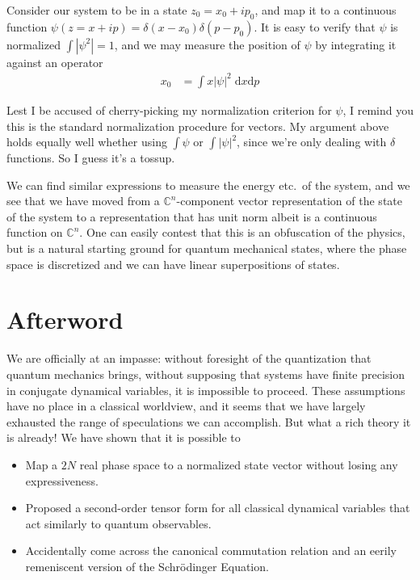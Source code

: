 \documentclass[12pt]{report}
\newcommand{\abs}[1]{\left|#1\right|}
\begin{document}
Consider our system to be in a state $z_0 = x_0 + ip_0$, and map it to a
continuous function $\psi(z=x+ip) = \delta(x-x_0)\delta(p-p_0)$. It is easy to
verify that $\psi$ is normalized $\int \abs{\psi^2} = 1$, and we may measure the
position of $\psi$ by integrating it against an operator
\begin{align}
    x_0 &= \int x \abs{\psi}^2 \;\mathrm{d}x\mathrm{d}p
\end{align}

Lest I be accused of cherry-picking my normalization criterion for $\psi$, I
remind you this is the standard normalization procedure for vectors. My argument
above holds equally well whether using $\int \psi$ or $\int \abs{\psi}^2$, since
we're only dealing with $\delta$ functions. So I guess it's a tossup.

We can find similar expressions to measure the energy etc.\ of the system, and we
see that we have moved from a $\mathbb{C}^n$-component vector representation of
the state of the system to a representation that has unit norm albeit is a
continuous function on $\mathbb{C}^n$. One can easily contest that this is an
obfuscation of the physics, but is a natural starting ground for quantum
mechanical states, where the phase space is discretized and we can have linear
superpositions of states.

\section{Afterword}

We are officially at an impasse: without foresight of the quantization that
quantum mechanics brings, without supposing that systems have finite precision
in conjugate dynamical variables, it is impossible to proceed. These assumptions
have no place in a classical worldview, and it seems that we have largely
exhausted the range of speculations we can accomplish. But what a rich theory it
is already! We have shown that it is possible to
\begin{itemize}
    \item Map a $2N$ real phase space to a normalized state vector without
        losing any expressiveness.

    \item Proposed a second-order tensor form for all classical dynamical
        variables that act similarly to quantum observables.

    \item Accidentally come across the canonical commutation relation and an
        eerily remeniscent version of the Schr\"odinger Equation.
\end{itemize}
\end{document}
